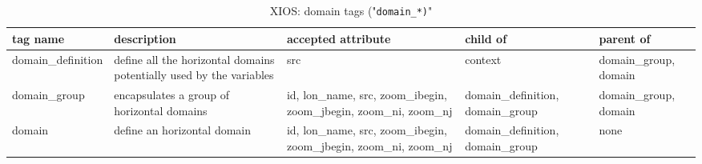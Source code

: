 \documentclass[../main/NEMO_manual]{subfiles}
\begin{document}
\begin{table}
  \begin{tabularx}{\textwidth}{|l|X|X|X|X|}
    \hline
    tag name                                                            &
    description                                                         &
    accepted attribute                                                  &
    child of                                                            &
    parent of               \\
    \hline
    \hline
    domain\_\-definition                                                &
    define all the horizontal domains potentially used by the variables &
    src                                                                 &
    context                                                             &
    domain\_\-group, domain \\
    \hline
    domain\_group                                                       &
    encapsulates a group of horizontal domains                          &
    id, lon\_name, src, zoom\_ibegin, zoom\_jbegin, zoom\_ni, zoom\_nj  &
    domain\_\-definition, domain\_group                                 &
    domain\_\-group, domain \\
    \hline
    domain                                                              &
    define an horizontal domain                                         &
    id, lon\_name, src, zoom\_ibegin, zoom\_jbegin, zoom\_ni, zoom\_nj  &
    domain\_\-definition, domain\_group                                 &
    none                    \\
    \hline
  \end{tabularx}
  \caption{XIOS: domain tags ("\texttt{domain\_*)}"}
\end{table}
\end{document}
